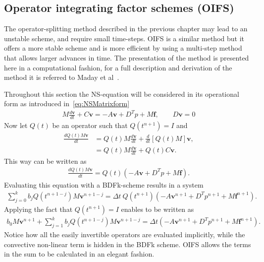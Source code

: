 \subsection{Operator integrating factor schemes (OIFS)}\label{OIFS}
The operator-splitting method described in the previous chapter may lead to an unstable scheme, 
and require small time-steps.
OIFS is a similar method but it offers a more stable scheme and is more efficient by using a multi-step method that allows 
larger advances in time. The presentation of the method is presented here in a computational fashion,
for a full description and derivation of the method it is referred to Maday et al~\cite{raey}.

Throughout this section the NS-equation will be considered in its operational form as introduced in~\ref{eq:NSMatrixform}
%
\begin{align}
    M\frac{d \mathbf{v}}{dt} + C\mathbf{v} = -A\mathbf{v} +D^T p +M\mathbf{f}, \qquad D\mathbf{v} = 0
    \label{eq:NSoperator}
\end{align}
%
Now let $Q(t)$ be an operator such that $Q(t^{n+1}) = I$ and 
%
\begin{align}
    \frac{dQ(t)M\mathbf{v}}{dt} &=  Q(t)M\frac{d\mathbf{v}}{dt} + \frac{d}{dt}\left[  Q(t)M\right]\mathbf{v},\\
    &= Q(t)M\frac{d\mathbf{v}}{dt} + Q(t)C\mathbf{v}. 
    \label{eq:integrationalfactor}
\end{align}
%
This way  can be written as 
\begin{align}
    \frac{d Q(t)M\mathbf{v}}{dt} =Q(t)( -A\mathbf{v} +D^T p +M\mathbf{f}).
    \label{eq:NSoperatorOIFS}
\end{align}
Evaluating this equation with a BDFk-scheme results in a system 
\begin{align}
    \sum_{j=0}^{k}b_jQ(t^{n+1-j})M\mathbf{v}^{n+1-j} =\Delta t \: Q(t^{n+1})( -A\mathbf{v}^{n+1} +D^T p^{n+1} +M\mathbf{f}^{n+1}).
    \label{eq:NSOIFS1}
\end{align}
Applying the fact that $Q(t^{n+1}) = I$ enables  to be written as 
\begin{align}
    b_0M\mathbf{v}^{n+1} + \sum_{j=1}^{k}b_jQ(t^{n+1-j})M\mathbf{v}^{n+1-j} 
    =\Delta t ( -A\mathbf{v}^{n+1} +D^T p^{n+1} +M\mathbf{f}^{n+1}).
    \label{eq:NSOIFS1}
\end{align}
Notice how all the easily invertible operators are evaluated implicitly, while the convective non-linear term is hidden in the BDFk scheme. 
OIFS allows the terms in the sum to be calculated in an elegant fashion.
